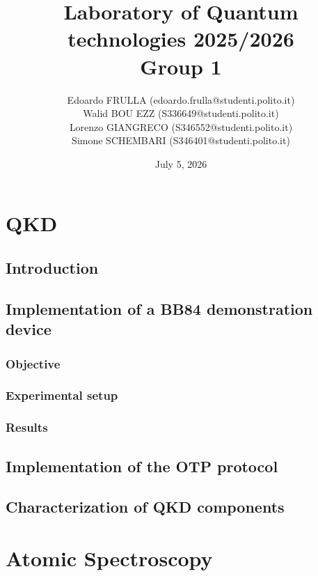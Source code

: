 \documentclass{report}
\title{Laboratory of Quantum technologies 2025/2026 \\ Group 1}
\author{Edoardo FRULLA (edoardo.frulla@studenti.polito.it)
  \\ Walid BOU EZZ (S336649@studenti.polito.it)
  \\ Lorenzo GIANGRECO (S346552@studenti.polito.it)
\\ Simone SCHEMBARI (S346401@studenti.polito.it)}
\date{July 5, 2026}                       %
\begin{document}
\maketitle
\tableofcontents

\chapter{QKD}

\section{Introduction}

\section{Implementation of a BB84 demonstration device}

\label{sec:bb84}

\subsection{Objective}


\subsection{Experimental setup}


\subsection{Results}


\section{Implementation of the OTP protocol}



\section{Characterization of QKD components}



\chapter{Atomic Spectroscopy}
\end{document}
